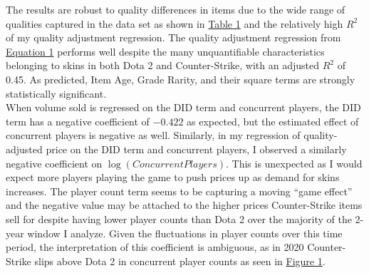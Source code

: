 \documentclass[12pt,letterpaper]{article}
\begin{document}
The results are robust to quality differences in items due to the wide range of qualities captured in the data set as shown in \hyperref[tab:cs-dota2-compare]{Table 1} and the relatively high \(R^2\) of my quality adjustment regression. The quality adjustment regression from \hyperref[eq:phat_reg]{Equation 1} performs well despite the many unquantifiable characteristics belonging to skins in both Dota 2 and Counter-Strike, with an adjusted \(R^2\) of 0.45. As predicted, Item Age, Grade Rarity, and their square terms are strongly statistically significant.\\

When volume sold is regressed on the DID term and concurrent players, the DID term has a negative coefficient of \(-0.422\) as expected, but the estimated effect of concurrent players is negative as well. Similarly, in my regression of quality-adjusted price on the DID term and concurrent players, I observed a similarly negative coefficient on \(\log(ConcurrentPlayers)\). This is unexpected as I would expect more players playing the game to push prices up as demand for skins increases. The player count term seems to be capturing a moving ``game effect'' and the negative value may be attached to the higher prices Counter-Strike items sell for despite having lower player counts than Dota 2 over the majority of the 2-year window I analyze. Given the fluctuations in player counts over this time period, the interpretation of this coefficient is ambiguous, as in 2020 Counter-Strike slips above Dota 2 in concurrent player counts as seen in \hyperref[fig:trade_delta]{Figure 1}. \\
\end{document}
